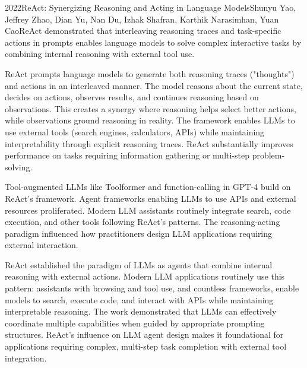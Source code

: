 
\begin{papersummary}{2022}{ReAct: Synergizing Reasoning and Acting in Language Models}{Shunyu Yao, Jeffrey Zhao, Dian Yu, Nan Du, Izhak Shafran, Karthik Narasimhan, Yuan Cao}{ReAct demonstrated that interleaving reasoning traces and task-specific actions in prompts enables language models to solve complex interactive tasks by combining internal reasoning with external tool use.}

ReAct prompts language models to generate both reasoning traces ("thoughts") and actions in an interleaved manner. The model reasons about the current state, decides on actions, observes results, and continues reasoning based on observations. This creates a synergy where reasoning helps select better actions, while observations ground reasoning in reality. The framework enables LLMs to use external tools (search engines, calculators, APIs) while maintaining interpretability through explicit reasoning traces. ReAct substantially improves performance on tasks requiring information gathering or multi-step problem-solving.

Tool-augmented LLMs like Toolformer and function-calling in GPT-4 build on ReAct's framework. Agent frameworks enabling LLMs to use APIs and external resources proliferated. Modern LLM assistants routinely integrate search, code execution, and other tools following ReAct's patterns. The reasoning-acting paradigm influenced how practitioners design LLM applications requiring external interaction.

ReAct established the paradigm of LLMs as agents that combine internal reasoning with external actions. Modern LLM applications routinely use this pattern: assistants with browsing and tool use, and countless frameworks, enable models to search, execute code, and interact with APIs while maintaining interpretable reasoning. The work demonstrated that LLMs can effectively coordinate multiple capabilities when guided by appropriate prompting structures. ReAct's influence on LLM agent design makes it foundational for applications requiring complex, multi-step task completion with external tool integration.

\end{papersummary}
